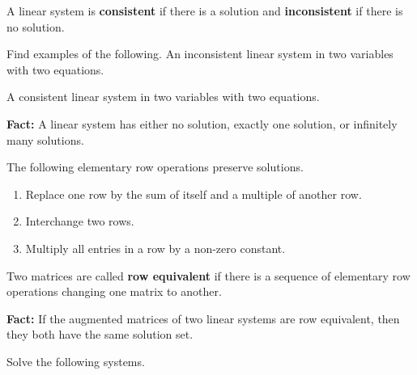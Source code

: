 \documentclass[12pt,letterpaper]{article}
\begin{document}
\begin{enumerate}
\begin{defn}
A linear system is {\bf consistent} if there is a solution and {\bf inconsistent} if there is no solution.
\end{defn}

\Problem Find examples of the following.
\Part An inconsistent linear system in two variables with two equations.

\vfill

\Part A consistent linear system in two variables with two equations.

\vfill



\newpage

{\bf Fact:} A linear system has either no solution, exactly one solution, or infinitely many solutions.

\begin{defn}
The following elementary row operations preserve solutions.
\begin{enumerate}
\item Replace one row by the sum of itself and a multiple of another row.
\item Interchange two rows.
\item Multiply all entries in a row by a non-zero constant.
\end{enumerate}
\end{defn}

\begin{defn}
Two matrices are called {\bf row equivalent} if there is a sequence of elementary row operations changing one matrix to another.
\end{defn}

{\bf Fact:} If the augmented matrices of two linear systems are row equivalent, then they both have the same solution set. 

\Problem Solve the following systems.


\end{enumerate}
\end{document}
